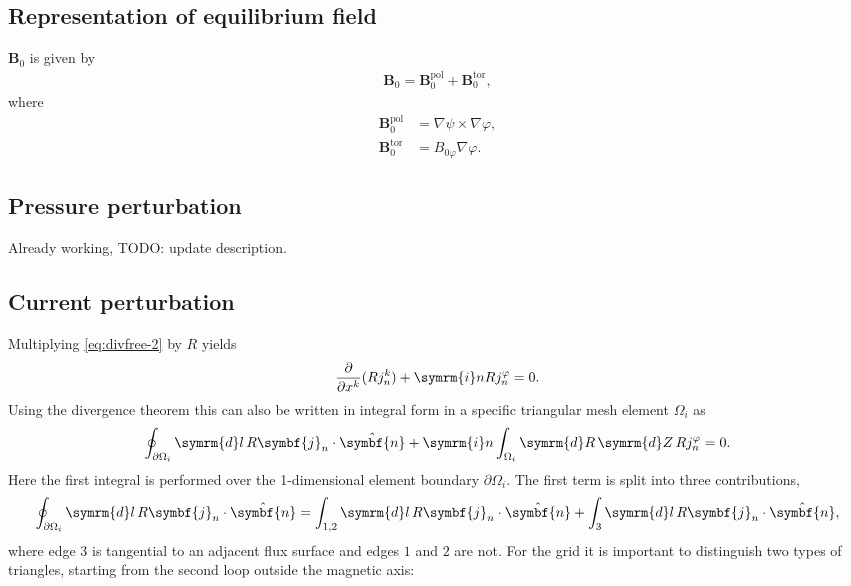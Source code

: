 \documentclass[a4paper, 10pt, english]{article}
\let\temp\vartheta
\let\vartheta\theta
\let\theta\temp
\let\temp\varphi
\let\varphi\phi
\let\phi\temp
\let\vec\symbf
\newcommand*\diff{\ensuremath{\symrm{d}}}
\newcommand*\im{\ensuremath{\symrm{i}}}
\newcommand*\pd[2][]{\ensuremath{\frac{\partial #1}{\partial #2}}}
\newcommand*\pol{\ensuremath{\textrm{pol}}}
\newcommand*\tor{\ensuremath{\textrm{tor}}}
\begin{document}
\subsection{Representation of equilibrium field}

$\vec{B}_{0}$ is given by
\begin{gather}
  \vec{B}_{0} = \vec{B}_{0}^{\pol} + \vec{B}_{0}^{\tor},
\end{gather}
where 
\begin{align}
  \vec{B}_{0}^{\pol} &= \nabla \psi \times \nabla \phi, \\
  \vec{B}_{0}^{\tor} &= B_{0 \phi} \nabla \phi.
\end{align}

\subsection{Pressure perturbation}

Already working, TODO: update description.

\subsection{Current perturbation}

Multiplying \cref{eq:divfree-2} by $R$ yields
\begin{gather}
  \pd{x^{k}} (R j_{n}^{k}) + \im n R j_{n}^{\phi} = 0.
\end{gather}
Using the divergence theorem this can also be written in integral form in a specific triangular mesh element $\Omega_{i}$ as
\begin{gather}
  \oint_{\partial \Omega_{i}} \diff l \, R \vec{j}_{n} \cdot \hat{\vec{n}} + \im n \int_{\Omega_{i}} \diff R \, \diff Z \, R j_{n}^{\phi} = 0.
\end{gather}
Here the first integral is performed over the 1-dimensional element boundary $\partial \Omega_{i}$. The first term is split into three contributions,
\begin{gather}
  \oint_{\partial \Omega_{i}} \diff l \, R \vec{j}_{n} \cdot \hat{\vec{n}} = \int_{1, 2} \diff l \, R \vec{j}_{n} \cdot \hat{\vec{n}} + \int_{3} \diff l \, R \vec{j}_{n} \cdot \hat{\vec{n}}, \label{eq:integral law}
\end{gather}
where edge $3$ is tangential to an adjacent flux surface and edges $1$ and $2$ are not. For the grid it is important to distinguish two types of triangles, starting from the second loop outside the magnetic axis:
\end{document}
